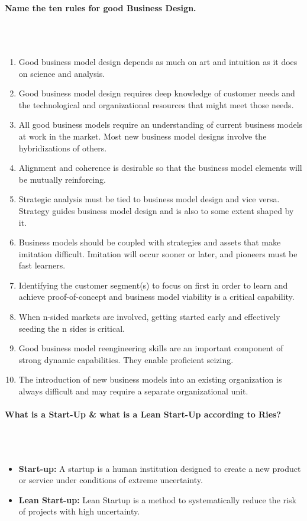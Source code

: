 \documentclass[10pt,a4paper,noendnumber=true]{scrartcl}
\newcommand{\properparagraph}[1]{\paragraph{\textcolor{Emerald}{#1}}\mbox{}\\}
\begin{document}
\properparagraph{Name the ten rules for good Business Design.}
\\[-6ex]
\begin{enumerate}
	\item  Good business model design depends as much on art and intuition as it does on science
	and analysis.
	\item Good business model design requires deep knowledge of customer needs and the
	technological and organizational resources that might meet those needs.
	\item All good business models require an understanding of current business models at work in
	the market. Most new business model designs involve the hybridizations of others.
	\item Alignment and coherence is desirable so that the business model elements will be
	mutually reinforcing.
	\item Strategic analysis must be tied to business model design and vice versa. Strategy guides
	business model design and is also to some extent shaped by it.
	\item Business models should be coupled with strategies and assets that make imitation
	difficult. Imitation will occur sooner or later, and pioneers must be fast learners.
	\item Identifying the customer segment(s) to focus on first in order to learn and achieve
	proof-of-concept and business model viability is a critical capability.
	\item When n-sided markets are involved, getting started early and effectively seeding the
	n sides is critical.
	\item Good business model reengineering skills are an important component of strong
	dynamic capabilities. They enable proficient seizing.
	\item The introduction of new business models into an existing organization is always
	difficult and may require a separate organizational unit.	
\end{enumerate}

\properparagraph{What is a Start-Up \& what is a Lean Start-Up according to Ries?}
\\[-6ex]
\begin{itemize}
	\item \textbf{Start-up:} A startup is a human institution designed to create a new product or service under conditions of extreme uncertainty.
	\item \textbf{Lean Start-up:} Lean Startup is a method to systematically reduce the risk of	projects with high uncertainty.
\end{itemize}
\end{document}
